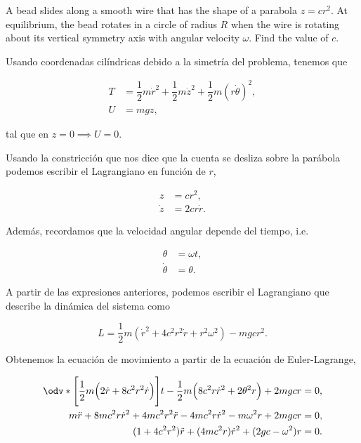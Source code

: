 \documentclass[../main.tex]{subfiles}
\begin{document}
\begin{problema}
	A bead slides along a smooth wire that has the shape of a parabola
	\(z = cr^{2}\). At equilibrium, the bead rotates in a circle of radius \(R\)
	when the wire is rotating about its vertical symmetry axis with angular velocity
	\(\omega\). Find the value of \(c\).

	\startsolution

	Usando coordenadas cilíndricas debido a la simetría del problema, tenemos que

	\begin{align*}
		T & = \dfrac{1}{2}m \dot{r}^{2} + \dfrac{1}{2}m \dot{z}^{2} + \dfrac{1}{2}m(r \dot{\theta})^{2}, \\
		U & = mgz,
	\end{align*}

	tal que en \(z = 0 \implies U = 0\).

	Usando la constricción que nos dice que la cuenta se desliza sobre la parábola
	podemos escribir el Lagrangiano en función de \(r\),

	\begin{align*}
		z       & = cr^{2},      \\
		\dot{z} & = 2cr \dot{r}.
	\end{align*}

	Además, recordamos que la velocidad angular depende del tiempo, i.e.

	\begin{align*}
		\theta       & = \omega t, \\
		\dot{\theta} & = \theta.
	\end{align*}

	A partir de las expresiones anteriores, podemos escribir el Lagrangiano que
	describe la dinámica del sistema como

	\begin{equation*}
		L  = \dfrac{1}{2}m(\dot{r}^{2} + 4c^{2}r^{2} \dot{r} + r^{2}\omega^{2}) - mgcr^{2}.
	\end{equation*}

	Obtenemos la ecuación de movimiento a partir de la ecuación de Euler-Lagrange,

	\begin{align*}
		\odv*{\Biggl[\dfrac{1}{2}m \Bigl(2 \dot{r} + 8c^{2}r^{2} \dot{r}\Bigr)\Biggr]}{t} - \dfrac{1}{2}m \Bigl(8c^{2}r \dot{r}^{2} + 2\theta^{2}r\Bigr) + 2mgcr & = 0, \\
		m \ddot{r} + 8mc^{2}r \dot{r}^{2} + 4mc^{2}r^{2}\ddot{r} - 4mc^{2}r \dot{r}^{2} - m\omega^{2}r + 2mgcr                                                   & = 0, \\
		(1 + 4c^{2}r^{2})\ddot{r} + (4mc^{2}r)\dot{r}^{2} + (2gc - \omega^{2})r                                                                                  & = 0.
	\end{align*}


\end{problema}
\end{document}
